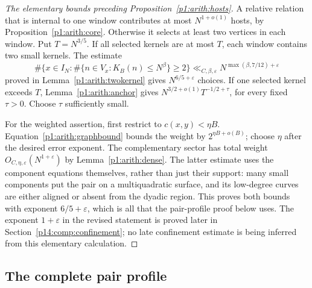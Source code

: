 \begin{proof}[The elementary bounds preceding Proposition~\ref{p1:arith:hosts}]
A relative relation that is internal to one window contributes at most
$N^{1+o(1)}$ hosts, by Proposition~\ref{p1:arith:core}.  Otherwise it selects
at least two vertices in each window.  Put $T=N^{3/5}$.  If all selected
kernels are at most $T$, each window contains two small kernels.  The estimate
\begin{equation}\label{p1:arith:twokernelused}
 \#\{x\in I_N:\#\{n\in V_x:K_B(n)\leq N^\beta\}\geq2\}
   \ll_{C,\beta,\varepsilon}N^{\max(\beta,7/12)+\varepsilon}
\end{equation}
proved in Lemma~\ref{p1:arith:twokernel} gives $N^{6/5+\varepsilon}$
choices.  If one selected kernel exceeds $T$, Lemma~\ref{p1:arith:anchor}
gives
$N^{3/2+o(1)}T^{-1/2+\tau}$, for every fixed $\tau>0$.
Choose $\tau$ sufficiently small.

For the weighted assertion, first restrict to $c(x,y)<\eta B$.
Equation~\eqref{p1:arith:graphbound} bounds the weight by
$2^{\eta B+o(B)}$; choose $\eta$ after the desired error exponent.
The complementary sector has total weight $O_{C,\eta,\varepsilon}(N^{1+\varepsilon})$
by Lemma~\ref{p1:arith:dense}.  The latter estimate uses the component
equations themselves, rather than just their support: many small components
put the pair on a multiquadratic surface, and its low-degree curves are either
aligned or absent from the dyadic region.
This proves both bounds with exponent $6/5+\varepsilon$, which is all
that the pair-profile proof below uses. The exponent $1+\varepsilon$
in the revised statement is proved later in
Section~\ref{p14:comp:confinement}; no late confinement estimate is
being inferred from this elementary calculation.
\end{proof}

\subsection{The complete pair profile}
\label{p14:comp:complete-profile}


